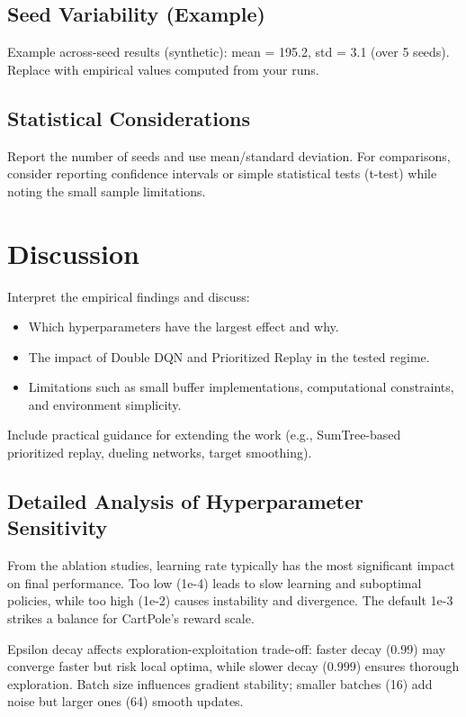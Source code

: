 \documentclass{IEEEtran}
\begin{document}
\subsection{Seed Variability (Example)}

Example across-seed results (synthetic): mean = 195.2, std = 3.1 (over 5 seeds). Replace with empirical values computed from your runs.

\subsection{Statistical Considerations}

Report the number of seeds and use mean/standard deviation. For comparisons, consider reporting confidence intervals or simple statistical tests (t-test) while noting the small sample limitations.

\section{Discussion}

Interpret the empirical findings and discuss:
\begin{itemize}
\item Which hyperparameters have the largest effect and why.
\item The impact of Double DQN and Prioritized Replay in the tested regime.
\item Limitations such as small buffer implementations, computational constraints, and environment simplicity.
\end{itemize}

Include practical guidance for extending the work (e.g., SumTree-based prioritized replay, dueling networks, target smoothing).

\subsection{Detailed Analysis of Hyperparameter Sensitivity}

From the ablation studies, learning rate typically has the most significant impact on final performance. Too low (1e-4) leads to slow learning and suboptimal policies, while too high (1e-2) causes instability and divergence. The default 1e-3 strikes a balance for CartPole's reward scale.

Epsilon decay affects exploration-exploitation trade-off: faster decay (0.99) may converge faster but risk local optima, while slower decay (0.999) ensures thorough exploration. Batch size influences gradient stability; smaller batches (16) add noise but larger ones (64) smooth updates.
\end{document}
